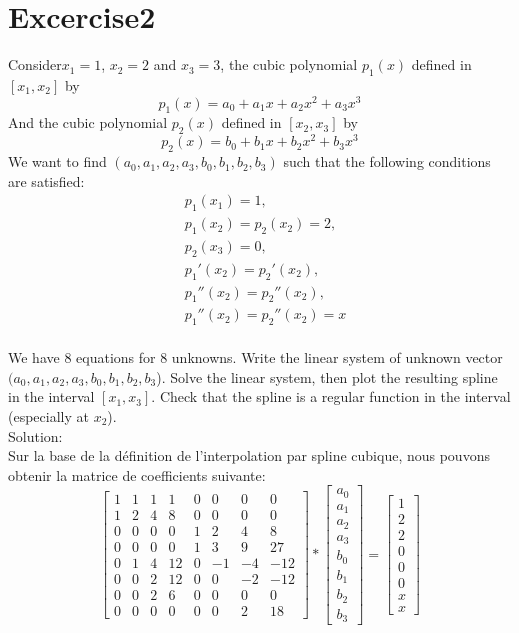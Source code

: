 \documentclass[11pt]{article}
\begin{document}
    \section*{Excercise2}
    Consider$ x_1 = 1$, $x_2 = 2$ and $x_3 = 3$, the cubic polynomial $p_1(x)$ defined in $[x_1,x_2]$ by
    \[p_1(x)=a_0+a_1x+a_2x^2+a_3x^3\]
    And the cubic polynomial $p_2(x)$ defined in $[x_2,x_3]$ by
    \[p_2(x)=b_0+b_1x+b_2x^2+b_3x^3\]
    We want to find $(a_0,a_1,a_2,a_3,b_0,b_1,b_2,b_3)$ such that the following conditions are satisfied:
    \begin{align*}
        &p_1(x_1)=1,\\
        &p_1(x_2)=p_2(x_2)=2,\\
        &p_2(x_3)=0,\\
        &p_1'(x_2)=p_2'(x_2),\\
        &p_1''(x_2)=p_2''(x_2),\\
        &p_1''(x_2)=p_2''(x_2)=x\\
    \end{align*}
    \raggedright
    We have 8 equations for 8 unknowns. Write the linear system of unknown vector $(a_0,a_1,a_2,a_3,b_0,b_1,b_2,b_3$). Solve the linear system, then plot the resulting spline in the interval $[x_1,x_3]$. Check that the spline is a regular function in the interval (especially at $x_2$).\\
    Solution:\\
    Sur la base de la définition de l'interpolation par spline cubique, nous pouvons obtenir la matrice de coefficients suivante:
    $$
    \begin{bmatrix}
        1&1&1&1&0&0&0&0\\
        1&2&4&8&0&0&0&0\\
        0&0&0&0&1&2&4&8\\
        0&0&0&0&1&3&9&27\\
        0&1&4&12&0&-1&-4&-12\\
        0&0&2&12&0&0&-2&-12\\
        0&0&2&6&0&0&0&0\\
        0&0&0&0&0&0&2&18
    \end{bmatrix}
    *
    \begin{bmatrix}
        a_0\\a_1\\a_2\\a_3\\b_0\\b_1\\b_2\\b_3
    \end{bmatrix}
    =
    \begin{bmatrix}
        1\\2\\2\\0\\0\\0\\x\\x
    \end{bmatrix}
    $$
\end{document}
